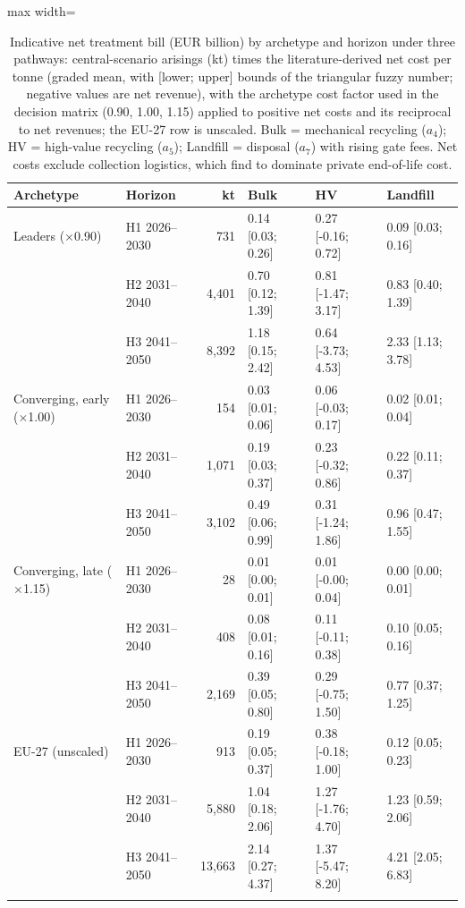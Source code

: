 \begin{table}[pos=t]\centering\footnotesize
\caption{Indicative net treatment bill (EUR billion) by archetype and horizon under three pathways: central-scenario arisings (kt) times the literature-derived net cost per tonne (graded mean, with [lower; upper] bounds of the triangular fuzzy number; negative values are net revenue), with the archetype cost factor used in the decision matrix (0.90, 1.00, 1.15) applied to positive net costs and its reciprocal to net revenues; the EU-27 row is unscaled. Bulk = mechanical recycling ($a_4$); HV = high-value recycling ($a_5$); Landfill = disposal ($a_7$) with rising gate fees. Net costs exclude collection logistics, which \citet{markert2020} find to dominate private end-of-life cost.}
\label{tab:cost}
\begin{adjustbox}{max width=\linewidth}\begin{tabular}{@{}llrlll@{}}\toprule
Archetype & Horizon & kt & Bulk & HV & Landfill \\ \midrule
Leaders ($\times$0.90) & H1 2026--2030 & 731 & 0.14 [0.03; 0.26] & 0.27 [-0.16; 0.72] & 0.09 [0.03; 0.16] \\
 & H2 2031--2040 & 4,401 & 0.70 [0.12; 1.39] & 0.81 [-1.47; 3.17] & 0.83 [0.40; 1.39] \\
 & H3 2041--2050 & 8,392 & 1.18 [0.15; 2.42] & 0.64 [-3.73; 4.53] & 2.33 [1.13; 3.78] \\
\addlinespace
Converging, early ($\times$1.00) & H1 2026--2030 & 154 & 0.03 [0.01; 0.06] & 0.06 [-0.03; 0.17] & 0.02 [0.01; 0.04] \\
 & H2 2031--2040 & 1,071 & 0.19 [0.03; 0.37] & 0.23 [-0.32; 0.86] & 0.22 [0.11; 0.37] \\
 & H3 2041--2050 & 3,102 & 0.49 [0.06; 0.99] & 0.31 [-1.24; 1.86] & 0.96 [0.47; 1.55] \\
\addlinespace
Converging, late ($\times$1.15) & H1 2026--2030 & 28 & 0.01 [0.00; 0.01] & 0.01 [-0.00; 0.04] & 0.00 [0.00; 0.01] \\
 & H2 2031--2040 & 408 & 0.08 [0.01; 0.16] & 0.11 [-0.11; 0.38] & 0.10 [0.05; 0.16] \\
 & H3 2041--2050 & 2,169 & 0.39 [0.05; 0.80] & 0.29 [-0.75; 1.50] & 0.77 [0.37; 1.25] \\
\addlinespace
EU-27 (unscaled) & H1 2026--2030 & 913 & 0.19 [0.05; 0.37] & 0.38 [-0.18; 1.00] & 0.12 [0.05; 0.23] \\
 & H2 2031--2040 & 5,880 & 1.04 [0.18; 2.06] & 1.27 [-1.76; 4.70] & 1.23 [0.59; 2.06] \\
 & H3 2041--2050 & 13,663 & 2.14 [0.27; 4.37] & 1.37 [-5.47; 8.20] & 4.21 [2.05; 6.83] \\
\addlinespace
\bottomrule\end{tabular}\end{adjustbox}\end{table}
